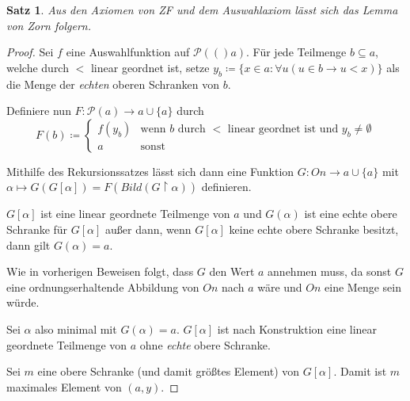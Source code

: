 \documentclass[german]{article}
\theoremstyle{break}
\theoremstyle{def_style}
\theoremstyle{def_style}
\newtheorem{satz}{Satz}[section]
\theoremstyle{lemma_style}
\newcommand{\Pot}[1]{\mathcal{P}(#1)}
\begin{document}
\begin{satz}
	Aus den Axiomen von ZF und dem Auswahlaxiom lässt sich das Lemma von Zorn folgern.
\end{satz}
\begin{proof}
	Sei $f$ eine Auswahlfunktion auf $\Pot(a)$. Für jede Teilmenge $b\subseteq a$, welche durch $<$ linear geordnet ist, setze $y_b\coloneqq\{x\in a:\forall u(u\in b\rightarrow u<x)\}$ als die Menge der \textit{echten} oberen Schranken von $b$.
	
	Definiere nun $F:\Pot{a}\to a\cup\{a\}$ durch
	$$
	F(b)\coloneqq\begin{cases}
		f(y_b) & \text{wenn } b \text{ durch } < \text{ linear geordnet ist und } y_b\neq\emptyset \\
		a & \text{sonst}
	\end{cases}
	$$
	
	Mithilfe des Rekursionssatzes lässt sich dann eine Funktion $G: On\to a\cup\{a\}$ mit $\alpha\mapsto G(G[\alpha])=F(Bild(G\upharpoonright\alpha))$ definieren.
	
	$G[\alpha]$ ist eine linear geordnete Teilmenge von $a$ und $G(\alpha)$ ist eine echte obere Schranke für $G[\alpha]$ außer dann, wenn $G[\alpha]$ keine echte obere Schranke besitzt, dann gilt $G(\alpha)=a$.
	
	Wie in vorherigen Beweisen folgt, dass $G$ den Wert $a$ annehmen muss, da sonst $G$ eine ordnungserhaltende Abbildung von $On$ nach $a$ wäre und $On$ eine Menge sein würde.
	
	Sei $\alpha$ also minimal mit $G(\alpha)=a$. $G[\alpha]$ ist nach Konstruktion eine linear geordnete Teilmenge von $a$ ohne \textit{echte} obere Schranke.
	
	Sei $m$ eine obere Schranke (und damit größtes Element) von $G[\alpha]$. Damit ist $m$ maximales Element von $(a,y)$.
\end{proof}
\end{document}
